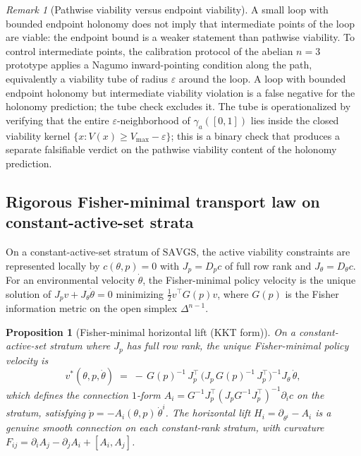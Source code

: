 \documentclass[11pt,a4paper]{article}
\theoremstyle{plain}
\newtheorem{proposition}[theorem]{Proposition}
\theoremstyle{definition}
\theoremstyle{remark}
\newtheorem{remark}[theorem]{Remark}
\newcommand{\SAVGS}{\mathrm{SAVGS}}
\begin{document}
\begin{remark}[Pathwise viability versus endpoint viability]
\label{rem:pathwise}
A small loop with bounded endpoint holonomy does not imply that
intermediate points of the loop are viable: the endpoint bound is a
weaker statement than pathwise viability. To control intermediate
points, the calibration protocol of the abelian $n=3$ prototype
applies a Nagumo inward-pointing condition along the path, equivalently
a viability tube of radius $\varepsilon$ around the loop. A loop with
bounded endpoint holonomy but intermediate viability violation is a
false negative for the holonomy prediction; the tube check excludes
it. The tube is operationalized by verifying that the entire
$\varepsilon$-neighborhood of $\gamma_a([0,1])$ lies inside the
closed viability kernel
$\{x : V(x)\geq V_{\max}-\varepsilon\}$; this is a binary check that
produces a separate falsifiable verdict on the pathwise viability
content of the holonomy prediction.
\end{remark}

\subsection{Rigorous Fisher-minimal transport law on constant-active-set strata}
\label{sec:fisher-transport}

On a constant-active-set stratum of $\SAVGS$, the active viability
constraints are represented locally by $c(\theta, p) = 0$ with
$J_p = D_p c$ of full row rank and $J_\theta = D_\theta c$. For an
environmental velocity $\dot\theta$, the Fisher-minimal policy
velocity is the unique solution of $J_p v + J_\theta\dot\theta = 0$
minimizing $\tfrac12 v^\top G(p) v$, where $G(p)$ is the Fisher
information metric on the open simplex $\Delta^{n-1}$.

\begin{proposition}[Fisher-minimal horizontal lift (KKT form)]
\label{prop:kkt}
On a constant-active-set stratum where $J_p$ has full row rank, the
unique Fisher-minimal policy velocity is
\begin{equation}\label{eq:kkt}
  v^*(\theta, p, \dot\theta) \;=\;
  -\,G(p)^{-1}\,J_p^{\!\top}\,\bigl(J_p\,G(p)^{-1}\,J_p^{\!\top}\bigr)^{-1}\!J_\theta\,\dot\theta,
\end{equation}
which defines the connection $1$-form
$A_i = G^{-1} J_p^{\!\top}(J_p G^{-1} J_p^{\!\top})^{-1}\partial_i c$
on the stratum, satisfying $\dot p = -A_i(\theta, p)\,\dot\theta^i$.
The horizontal lift $H_i = \partial_{\theta^i} - A_i$ is a genuine
smooth connection on each constant-rank stratum, with curvature
$F_{ij} = \partial_i A_j - \partial_j A_i + [A_i, A_j]$.
\end{proposition}
\end{document}
